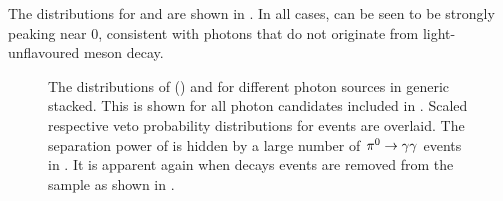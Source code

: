 The distributions for \piVeto and \etaVeto are shown in .
In all cases, \BtoXsgamma can be seen to be strongly peaking near 0, consistent with photons that do not originate from light-unflavoured meson decay.

\begin{figure}[htbp!]
    \centering
    \caption{\label{fig:vetos} The distributions of \piVeto () and \etaVeto {} 
    for different photon sources in generic \MC stacked.
    This is shown for all photon candidates included in .
    Scaled respective veto probability distributions for \BtoXsgamma events are overlaid.
    The separation power of \etaVeto is hidden by a large number of $\pi^0\rightarrow\gamma\gamma$ events in .
    It is apparent again when \piz decays events are removed from the sample as shown in .
    }
\end{figure}

